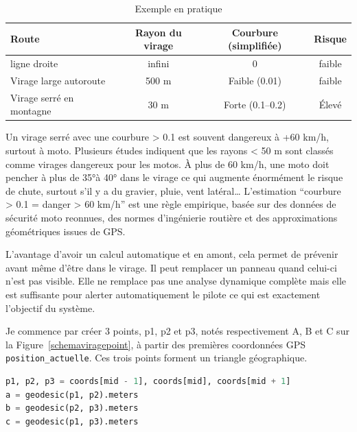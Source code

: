 \begin{table}[ht]
\centering
\begin{tabular}{|l|c|c|c|}
\hline
Route & Rayon du virage & Courbure (simplifiée) & Risque \\
\hline
ligne droite & infini & 0 & faible \\
Virage large autoroute & 500 m & Faible (0.01) & faible \\
Virage serré en montagne & 30 m & Forte (0.1–0.2) & Élevé \\
\hline
\end{tabular}
\caption{Exemple en pratique}
\end{table}

Un virage serré avec une courbure > 0.1 est souvent dangereux à +60 km/h, surtout à moto.
Plusieurs études indiquent que les rayons < 50 m sont classés comme virages dangereux pour les motos. À plus de 60 km/h, une moto doit pencher à plus de 35°à 40° dans le virage ce qui augmente énormément le risque de chute, surtout s’il y a du gravier, pluie, vent latéral…
L’estimation “courbure > 0.1 = danger > 60 km/h” est une règle empirique, basée sur des données de sécurité moto reonnues, des normes d'ingénierie routière et des approximations géométriques issues de GPS.


L'avantage d'avoir un calcul automatique et en amont, cela permet de prévenir avant même d'être dans le virage. Il peut remplacer un panneau quand celui-ci n'est pas visible. Elle ne remplace pas une analyse dynamique complète mais elle est suffisante pour alerter automatiquement le pilote ce qui est exactement l’objectif du système.

Je commence par créer 3 points, p1, p2 et p3, notés respectivement A, B et C sur la Figure~\ref{schemaviragepoint}, à partir des premières coordonnées GPS \texttt{position\_actuelle}. Ces trois points forment un triangle géographique.
\begin{lstlisting}[language=Python, caption={Calcul de points}]
p1, p2, p3 = coords[mid - 1], coords[mid], coords[mid + 1]
a = geodesic(p1, p2).meters
b = geodesic(p2, p3).meters
c = geodesic(p1, p3).meters
\end{lstlisting}

